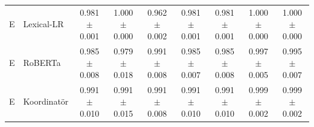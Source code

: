\begin{table}[t]
\begin{tabular}{llccccccc}
E & Lexical-LR & 0.981 $\pm$ 0.001 & 1.000 $\pm$ 0.000 & 0.962 $\pm$ 0.002 & 0.981 $\pm$ 0.001 & 0.981 $\pm$ 0.001 & 1.000 $\pm$ 0.000 & 1.000 $\pm$ 0.000 \\
E & RoBERTa & 0.985 $\pm$ 0.008 & 0.979 $\pm$ 0.018 & 0.991 $\pm$ 0.008 & 0.985 $\pm$ 0.007 & 0.985 $\pm$ 0.008 & 0.997 $\pm$ 0.005 & 0.995 $\pm$ 0.007 \\
E & Koordinatör & 0.991 $\pm$ 0.010 & 0.991 $\pm$ 0.015 & 0.991 $\pm$ 0.008 & 0.991 $\pm$ 0.010 & 0.991 $\pm$ 0.010 & 0.999 $\pm$ 0.002 & 0.999 $\pm$ 0.002 \\
\bottomrule
\end{tabular}
\end{table}
